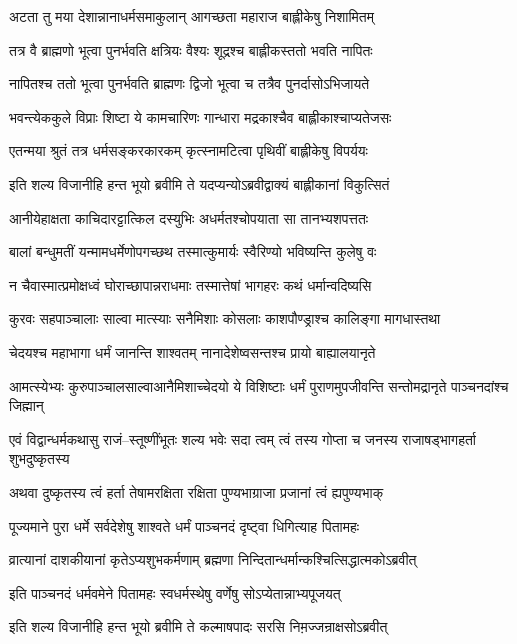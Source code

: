 \twolineshloka
{अटता तु मया देशान्नानाधर्मसमाकुलान्}
{आगच्छता महाराज बाह्लीकेषु निशामितम्}


\twolineshloka
{तत्र वै ब्राह्मणो भूत्वा पुनर्भवति क्षत्रियः}
{वैश्यः शूद्रश्च बाह्लीकस्ततो भवति नापितः}


\twolineshloka
{नापितश्च ततो भूत्वा पुनर्भवति ब्राह्मणः}
{द्विजो भूत्वा च तत्रैव पुनर्दासोऽभिजायते}


\twolineshloka
{भवन्त्येककुले विप्राः शिष्टा ये कामचारिणः}
{गान्धारा मद्रकाश्चैव बाह्लीकाश्चाप्यतेजसः}


\twolineshloka
{एतन्मया श्रुतं तत्र धर्मसङ्करकारकम्}
{कृत्स्नामटित्वा पृथिवीं बाह्लीकेषु विपर्ययः}


\twolineshloka
{इति शल्य विजानीहि हन्त भूयो ब्रवीमि ते}
{यदप्यन्योऽब्रवीद्वाक्यं बाह्लीकानां विकुत्सितं}


\twolineshloka
{आनीयेहाक्षता काचिदारट्टात्किल दस्युभिः}
{अधर्मतश्चोपयाता सा तानभ्यशपत्ततः}


\twolineshloka
{बालां बन्धुमतीं यन्मामधर्मेणोपगच्छथ}
{तस्मात्कुमार्यः स्वैरिण्यो भविष्यन्ति कुलेषु वः}


\twolineshloka
{न चैवास्मात्प्रमोक्षध्वं घोराच्छापान्नराधमाः}
{तस्मात्तेषां भागहरः कथं धर्मान्वदिष्यसि}


\twolineshloka
{कुरवः सहपाञ्चालाः साल्वा मात्स्याः सनैमिशाः}
{कोसलाः काशपौण्ड्राश्च कालिङ्गा मागधास्तथा}


\twolineshloka
{चेदयश्च महाभागा धर्मं जानन्ति शाश्वतम्}
{नानादेशेष्वसन्तश्च प्रायो बाह्यालयानृते}


\twolineshloka
{आमत्स्येभ्यः कुरुपाञ्चालसाल्वाआनैमिशाच्चेदयो ये विशिष्टाः}
{धर्मं पुराणमुपजीवन्ति सन्तोमद्रानृते पाञ्चनदांश्च जिह्मान्}


\twolineshloka
{एवं विद्वान्धर्मकथासु राजं--स्तूष्णींभूतः शल्य भवेः सदा त्वम्}
{त्वं तस्य गोप्ता च जनस्य राजाषड्भागहर्ता शुभदुष्कृतस्य}


\twolineshloka
{अथवा दुष्कृतस्य त्वं हर्ता तेषामरक्षिता}
{रक्षिता पुण्यभाग्राजा प्रजानां त्वं ह्यपुण्यभाक्}


\twolineshloka
{पूज्यमाने पुरा धर्मे सर्वदेशेषु शाश्वते}
{धर्मं पाञ्चनदं दृष्ट्वा धिगित्याह पितामहः}


\twolineshloka
{व्रात्यानां दाशकीयानां कृतेऽप्यशुभकर्मणाम्}
{ब्रह्मणा निन्दितान्धर्मान्कश्चित्सिद्धात्मकोऽब्रवीत्}


\twolineshloka
{इति पाञ्चनदं धर्मवमेने पितामहः}
{स्वधर्मस्थेषु वर्णेषु सोऽप्येतान्नाभ्यपूजयत्}


\twolineshloka
{इति शल्य विजानीहि हन्त भूयो ब्रवीमि ते}
{कल्माषपादः सरसि निम़ज्जन्राक्षसोऽब्रवीत्}


